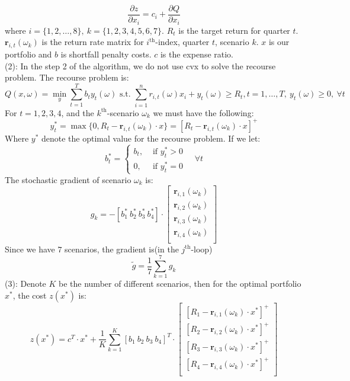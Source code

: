 \documentclass[11pt,a4paper]{article}
\begin{document}
$$
\frac{\partial z}{\partial x_{i}}=c_{i}+\frac{\partial Q}{\partial x_{i}}
$$
where $i=\{1,2,\ldots,8\},\ k=\{1,2,3,4,5,6,7\}$. $R_{t}$ is the target return for quarter $t$. $\mathbf{r}_{i,t}(\omega_{k})$ is the return rate matrix for $i^{\text{th}}$-index, quarter $t$, scenario $k$. $x$ is our portfolio and $b$ is shortfall penalty costs. $c$ is the expense ratio.\\
(2): In the step 2 of the algorithm, we do not use cvx to solve the recourse problem. The recourse problem is:
$$
Q(x, \omega)=\min _{y} \sum_{t=1}^{T} b_{t} y_{t}(\omega) \text { s.t. } \sum_{i=1}^{n} r_{i, t}(\omega) x_{i}+y_{t}(\omega) \geq R_{t}, t=1, \ldots, T,\ y_{t}(\omega) \geq 0,\ \forall t
$$
For $t=1,2,3,4$, and the $k^{\text{th}}$-scenario $\omega_{k}$ we must have the following:
$$y^{*}_{t}=\max\{0,R_{t}-\textbf{r}_{i,t}(\omega_{k})\cdot x\}=\left[R_{t}-\textbf{r}_{i,t}(\omega_{k})\cdot x\right]^{+}$$
Where $y^{*}$ denote the optimal value for the recourse problem. If we let:
$$
b_{t}^{*}=\left\{\begin{array}{ll}
	b_{t}, & \text { if }y_{t}^{*} > 0 \\
	0, & \text { if }y_{t}^{*} = 0
\end{array} \quad \forall t\right.
$$
The stochastic gradient of scenario $\omega_{k}$ is:
$$g_{k}=-\left[b^{*}_{1}\ b^{*}_{2}\ b^{*}_{3}\ b^{*}_{4}\right]\cdot\left[\begin{array}{c}
\textbf{r}_{i,1}(\omega_{k}) \\
\textbf{r}_{i,2}(\omega_{k}) \\
\textbf{r}_{i,3}(\omega_{k}) \\ 
\textbf{r}_{i,4}(\omega_{k})\\
\end{array}\right]$$
Since we have $7$ scenarios, the gradient is(in the $j^{\text{th}}$-loop) $$\widetilde{g}=\dfrac{1}{7}\sum_{k=1}^{7}g_{k}$$
(3): Denote $K$ be the number of different scenarios, then for the optimal portfolio $x^{*}$, the cost $z(x^{*})$ is:
$$z(x^{*})=c^{T}\cdot x^{*}+\dfrac{1}{K}\sum_{k=1}^{K}\left[b_{1}\ b_{2}\ b_{3}\ b_{4} \right]^{T}\cdot \left[\begin{array}{c}
\left[R_{1}-\textbf{r}_{i,1}(\omega_{k})\cdot x^{*}\right]^{+} \\
\left[R_{2}-\textbf{r}_{i,2}(\omega_{k})\cdot x^{*}\right]^{+} \\
\left[R_{3}-\textbf{r}_{i,3}(\omega_{k})\cdot x^{*}\right]^{+} \\ 
\left[R_{4}-\textbf{r}_{i,4}(\omega_{k})\cdot x^{*}\right]^{+} \\
\end{array}\right]$$
\end{document}
